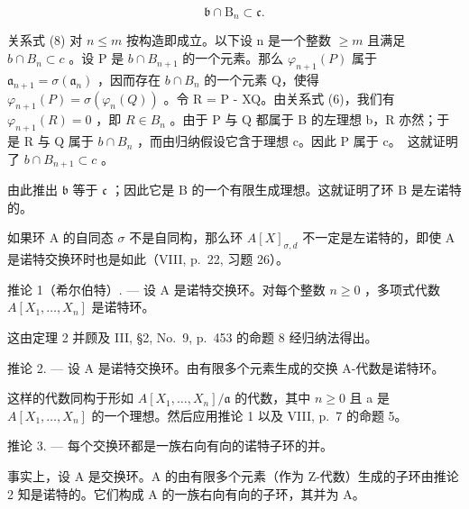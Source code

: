 \[
\mathfrak {b} \cap \mathrm{B} _ {n} \subset \mathfrak {c}.\tag{8}
\]

关系式 (8) 对 \(n \leqslant m\) 按构造即成立。以下设 n 是一个整数 \(\geqslant m\) 且满足 \(b \cap B_{n} \subset c\) 。设 P 是 \(b \cap B_{n+1}\) 的一个元素。那么 \(\varphi_{n+1}(P)\) 属于 \(\mathfrak{a}_{n+1} = \sigma(\mathfrak{a}_{n})\) ，因而存在 \(b \cap B_{n}\) 的一个元素 Q，使得 \(\varphi_{n+1}(P) = \sigma(\varphi_{n}(Q))\) 。令 R = P - XQ。由关系式 (6)，我们有 \(\varphi_{n+1}(R) = 0\) ，即 \(R \in B_{n}\) 。由于 P 与 Q 都属于 B 的左理想 b，R 亦然；于是 R 与 Q 属于 \(b \cap B_{n}\) ，而由归纳假设它含于理想 c。因此 P 属于 c。~这就证明了 \(b \cap B_{n+1} \subset c\) 。

由此推出 \(\mathfrak{b}\) 等于 \(\mathfrak{c}\) ；因此它是 B 的一个有限生成理想。这就证明了环 B 是左诺特的。

如果环 A 的自同态 \(\sigma\) 不是自同构，那么环 \(A[X]_{\sigma,d}\) 不一定是左诺特的，即使 A 是诺特交换环时也是如此（VIII, p.~22, 习题 26）。

推论 1（希尔伯特）. --- 设 A 是诺特交换环。对每个整数 \(n \geqslant 0\) ，多项式代数 \(A[X_{1}, \ldots, X_{n}]\) 是诺特环。

这由定理 2 并顾及 III, §2, No.~9, p.~453 的命题 8 经归纳法得出。

推论 2. --- 设 A 是诺特交换环。由有限多个元素生成的交换 A-代数是诺特环。

这样的代数同构于形如 \(A[X_{1},\ldots,X_{n}]/\mathfrak{a}\) 的代数，其中 \(n \geqslant 0\) 且 a 是 \(A[X_{1},\ldots,X_{n}]\) 的一个理想。然后应用推论 1 以及 VIII, p.~7 的命题 5。

推论 3. --- 每个交换环都是一族右向有向的诺特子环的并。

事实上，设 A 是交换环。A 的由有限多个元素（作为 Z-代数）生成的子环由推论 2 知是诺特的。它们构成 A 的一族右向有向的子环，其并为 A。

